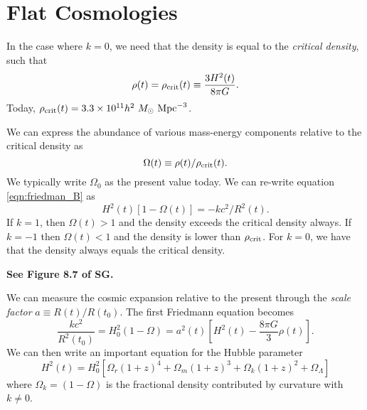 \documentclass[]{article}
\begin{document}
\section{Flat Cosmologies}

In the case where $k=0$, we need that the
density is equal to the {\it critical density}, such that
\begin{equation}
\rho(t) = \rho_{\mathrm{crit}}(t) \equiv \frac{3 H^2(t)}{8 \pi G}.
\end{equation}
\noindent
Today, $\rho_{\mathrm{crit}}(t) = 3.3\times 10^{11} h^2~M_{\odot}~\mathrm{Mpc}^{-3}$.

We can express the abundance of various mass-energy components
relative to the critical density as
\begin{equation}
\Omega(t) \equiv \rho(t)/\rho_{\mathrm{crit}}(t).
\end{equation}
\noindent
We typically write $\Omega_0$ as the present value today.
We can re-write equation \ref{eqn:friedman_B} as
\begin{equation}
H^2(t)[1 - \Omega(t)] = -kc^2/R^2(t).
\end{equation}
\noindent
If $k=1$, then $\Omega(t)>1$ and the density exceeds the
critical density always.  If $k=-1$ then $\Omega(t)<1$
and the density is lower than $\rho_{\mathrm{crit}}$. For $k=0$,
we have that the density always equals the critical
density.

{\bf See Figure 8.7 of SG.}

We can measure the cosmic expansion relative to the present
through the {\it scale factor} $a\equiv R(t)/R(t_0)$.
The first Friedmann equation becomes
\begin{equation}
\frac{kc^2}{R^2(t_0)} = H_0^2(1 - \Omega) = a^2(t)\left[ H^{2}(t) - \frac{8\pi G}{3}\rho(t)\right].
\end{equation}
\noindent
We can then write an important equation for the Hubble parameter
\begin{equation}
H^2(t) = H_0^2[\Omega_r (1+z)^4 + \Omega_m(1+z)^3 + \Omega_k(1+z)^2 + \Omega_{\Lambda}]
\end{equation}
\noindent
where $\Omega_k = (1-\Omega)$ is the fractional density contributed by curvature with $k\ne0$.
\end{document}
